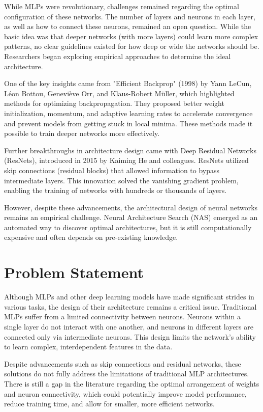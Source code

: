While MLPs were revolutionary, challenges remained regarding the optimal configuration of these networks. The number of layers and neurons in each layer, as well as how to connect these neurons, remained an open question. While the basic idea was that deeper networks (with more layers) could learn more complex patterns, no clear guidelines existed for how deep or wide the networks should be. Researchers began exploring empirical approaches to determine the ideal architecture.

One of the key insights came from "Efficient Backprop" (1998) by Yann LeCun, Léon Bottou, Geneviève Orr, and Klaus-Robert Müller, which highlighted methods for optimizing backpropagation. They proposed better weight initialization, momentum, and adaptive learning rates to accelerate convergence and prevent models from getting stuck in local minima. These methods made it possible to train deeper networks more effectively.

Further breakthroughs in architecture design came with Deep Residual Networks (ResNets), introduced in 2015 by Kaiming He and colleagues. ResNets utilized skip connections (residual blocks) that allowed information to bypass intermediate layers. This innovation solved the vanishing gradient problem, enabling the training of networks with hundreds or thousands of layers.

However, despite these advancements, the architectural design of neural networks remains an empirical challenge. Neural Architecture Search (NAS) emerged as an automated way to discover optimal architectures, but it is still computationally expensive and often depends on pre-existing knowledge.

\section{Problem Statement}

Although MLPs and other deep learning models have made significant strides in various tasks, the design of their architecture remains a critical issue. Traditional MLPs suffer from a limited connectivity between neurons. Neurons within a single layer do not interact with one another, and neurons in different layers are connected only via intermediate neurons. This design limits the network's ability to learn complex, interdependent features in the data.

Despite advancements such as skip connections and residual networks, these solutions do not fully address the limitations of traditional MLP architectures. There is still a gap in the literature regarding the optimal arrangement of weights and neuron connectivity, which could potentially improve model performance, reduce training time, and allow for smaller, more efficient networks.


